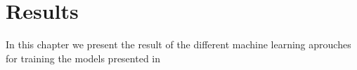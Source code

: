 \chapter{Results}
\label{cap:result}

In this chapter we present the result of the different machine learning aprouches
for training the models presented in 
